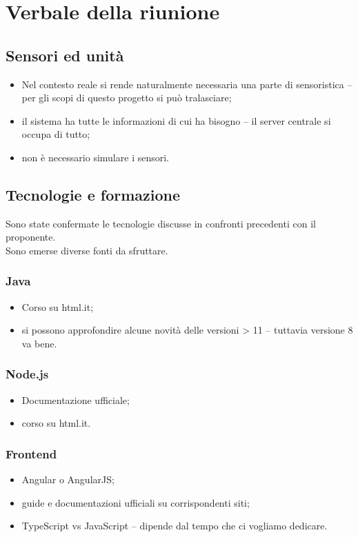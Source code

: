 \section{Verbale della riunione}

\subsection{Sensori ed unità}
\begin{itemize}
    \item Nel contesto reale si rende naturalmente necessaria una parte di sensoristica
    \subitem -- per gli scopi di questo progetto si può tralasciare;
    \item il sistema ha tutte le informazioni di cui ha bisogno
    \subitem -- il server centrale si occupa di tutto;
    \item non è necessario simulare i sensori.
\end{itemize}

\subsection{Tecnologie e formazione}
Sono state confermate le tecnologie discusse in confronti precedenti con il proponente.\\Sono emerse diverse fonti da sfruttare.
    \subsubsection{Java}
        \begin{itemize}
            \item Corso su html.it;
            \item si possono approfondire alcune novità delle versioni > 11
                \subitem -- tuttavia versione 8 va bene.
        \end{itemize}

    \subsubsection{Node.js}
        \begin{itemize}
            \item Documentazione ufficiale;
            \item corso su html.it.
        \end{itemize}

    \subsubsection{Frontend}
        \begin{itemize}
            \item Angular o AngularJS;
            \item guide e documentazioni ufficiali su corrispondenti siti;
            \item TypeScript vs JavaScript
                \subitem -- dipende dal tempo che ci vogliamo dedicare.
        \end{itemize}

